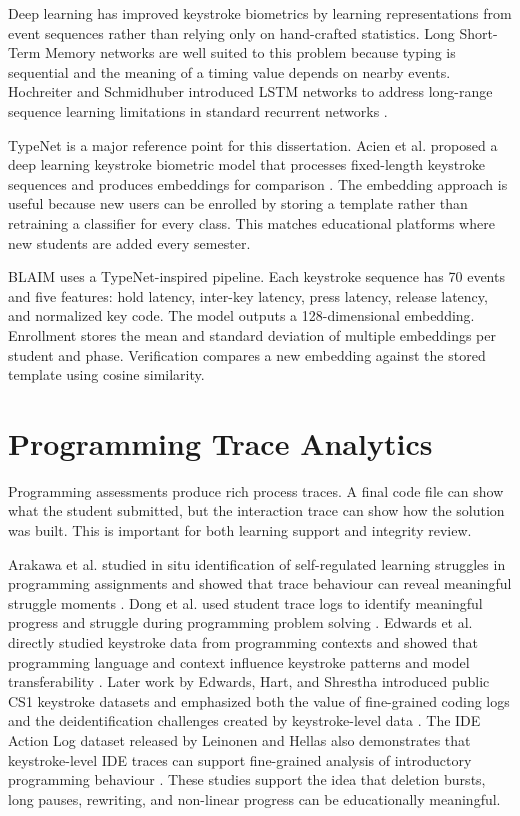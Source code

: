 Deep learning has improved keystroke biometrics by learning representations from event sequences rather than relying only on hand-crafted statistics. Long Short-Term Memory networks are well suited to this problem because typing is sequential and the meaning of a timing value depends on nearby events. Hochreiter and Schmidhuber introduced LSTM networks to address long-range sequence learning limitations in standard recurrent networks \cite{hochreiter1997lstm}.

TypeNet is a major reference point for this dissertation. Acien et al. proposed a deep learning keystroke biometric model that processes fixed-length keystroke sequences and produces embeddings for comparison \cite{acien2022typenet}. The embedding approach is useful because new users can be enrolled by storing a template rather than retraining a classifier for every class. This matches educational platforms where new students are added every semester.

BLAIM uses a TypeNet-inspired pipeline. Each keystroke sequence has 70 events and five features: hold latency, inter-key latency, press latency, release latency, and normalized key code. The model outputs a 128-dimensional embedding. Enrollment stores the mean and standard deviation of multiple embeddings per student and phase. Verification compares a new embedding against the stored template using cosine similarity.

\section{Programming Trace Analytics}
\label{sec:lit-trace}

Programming assessments produce rich process traces. A final code file can show what the student submitted, but the interaction trace can show how the solution was built. This is important for both learning support and integrity review.

Arakawa et al. studied in situ identification of self-regulated learning struggles in programming assignments and showed that trace behaviour can reveal meaningful struggle moments \cite{arakawa2021situ}. Dong et al. used student trace logs to identify meaningful progress and struggle during programming problem solving \cite{dong2021trace}. Edwards et al. directly studied keystroke data from programming contexts and showed that programming language and context influence keystroke patterns and model transferability \cite{edwards2020keystroke}. Later work by Edwards, Hart, and Shrestha introduced public CS1 keystroke datasets and emphasized both the value of fine-grained coding logs and the deidentification challenges created by keystroke-level data \cite{edwards2023csedm}. The IDE Action Log dataset released by Leinonen and Hellas also demonstrates that keystroke-level IDE traces can support fine-grained analysis of introductory programming behaviour \cite{leinonen2022ide}. These studies support the idea that deletion bursts, long pauses, rewriting, and non-linear progress can be educationally meaningful.

